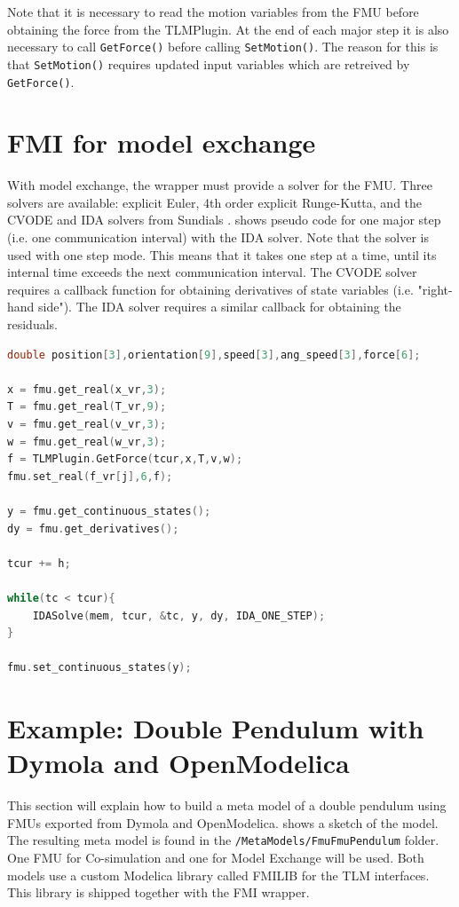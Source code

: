 \documentclass[11pt,a4paper,english]{report}
\begin{document}
Note that it is necessary to read the motion variables from the FMU before obtaining the force from the TLMPlugin. 
At the end of each major step it is also necessary to call \texttt{GetForce()} before calling \texttt{SetMotion()}.
The reason for this is that \texttt{SetMotion()} requires updated input variables which are retreived by \texttt{GetForce()}.

\vspace{0cm}

\clearpage
\section{FMI for model exchange}
\label{sec:fmi_me}
With model exchange, the wrapper must provide a solver for the FMU.
Three solvers are available: explicit Euler, 4th order explicit Runge-Kutta, and the CVODE and IDA solvers from Sundials \cite{hindmarsh2005}.
 shows pseudo code for one major step (i.e. one communication interval) with the IDA solver.
Note that the solver is used with one step mode.
This means that it takes one step at a time, until its internal time exceeds the next communication interval.
The CVODE solver requires a callback function for obtaining derivatives of state variables (i.e. "right-hand side").
The IDA solver requires a similar callback for obtaining the residuals.

\begin{lstlisting}[language=c++, basicstyle=\ttfamily\small,floatplacement=h,caption=Pseudo code for the simulation loop with FMI for model exchange,label=lst:wrapper_me]
double position[3],orientation[9],speed[3],ang_speed[3],force[6];

x = fmu.get_real(x_vr,3);
T = fmu.get_real(T_vr,9);
v = fmu.get_real(v_vr,3);
w = fmu.get_real(w_vr,3);
f = TLMPlugin.GetForce(tcur,x,T,v,w);
fmu.set_real(f_vr[j],6,f);

y = fmu.get_continuous_states();
dy = fmu.get_derivatives();

tcur += h;

while(tc < tcur){
    IDASolve(mem, tcur, &tc, y, dy, IDA_ONE_STEP);
}

fmu.set_continuous_states(y);
\end{lstlisting}

\clearpage
\section{Example: Double Pendulum with Dymola and OpenModelica}
This section will explain how to build a meta model of a double pendulum using FMUs exported from Dymola and OpenModelica.
 shows a sketch of the model.
The resulting meta model is found in the \texttt{/MetaModels/FmuFmuPendulum} folder.
One FMU for Co-simulation and one for Model Exchange will be used.
Both models use a custom Modelica library called FMILIB for the TLM interfaces.
This library is shipped together with the FMI wrapper.
\end{document}
